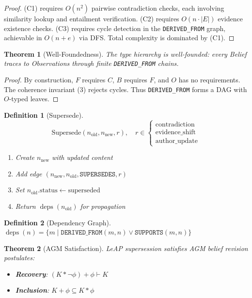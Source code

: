 \documentclass[11pt,letterpaper]{article}
\newtheorem{definition}{Definition}[section]
\newtheorem{theorem}{Theorem}[section]
\begin{document}
\begin{proof}
(C1) requires $O(n^2)$ pairwise contradiction checks, each involving similarity lookup and entailment verification. (C2) requires $O(n \cdot |E|)$ evidence existence checks. (C3) requires cycle detection in the \texttt{DERIVED\_FROM} graph, achievable in $O(n + e)$ via DFS. Total complexity is dominated by (C1).
\end{proof}

\begin{theorem}[Well-Foundedness]
\label{thm:wellfounded}
The type hierarchy is well-founded: every Belief traces to Observations through finite \texttt{DERIVED\_FROM} chains.
\end{theorem}

\begin{proof}
By construction, $F$ requires $C$, $B$ requires $F$, and $O$ has no requirements. The coherence invariant (3) rejects cycles. Thus \texttt{DERIVED\_FROM} forms a DAG with $O$-typed leaves.
\end{proof}

\begin{definition}[Supersede]
\[
\text{Supersede}(n_{\text{old}}, n_{\text{new}}, r),
\quad
r \in
\begin{cases}
\text{contradiction}\\
\text{evidence\_shift}\\
\text{author\_update}
\end{cases}
\]
\begin{enumerate}[noitemsep]
    \item Create $n_{\text{new}}$ with updated content
    \item Add edge $(n_{\text{new}}, n_{\text{old}}, \texttt{SUPERSEDES}, r)$
    \item Set $n_{\text{old}}.\text{status} \gets \text{superseded}$
    \item Return $\operatorname{deps}(n_{\text{old}})$ for propagation
\end{enumerate}
\end{definition}


\begin{definition}[Dependency Graph]
\label{def:deps}
$\operatorname{deps}(n) = \{m \mid \texttt{DERIVED\_FROM}(m, n) \vee \texttt{SUPPORTS}(m, n)\}$
\end{definition}

\begin{theorem}[AGM Satisfaction]
\label{thm:agm}
LeAP supersession satisfies AGM belief revision postulates:
\begin{itemize}[noitemsep]
    \item \textbf{Recovery}: $(K * \neg\phi) + \phi \vdash K$
    \item \textbf{Inclusion}: $K + \phi \subseteq K * \phi$
\end{itemize}
\end{theorem}
\end{document}
